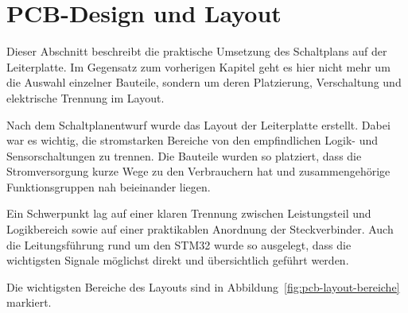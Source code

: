 \newpage
\section{PCB-Design und Layout}
Dieser Abschnitt beschreibt die praktische Umsetzung des Schaltplans auf der Leiterplatte. Im Gegensatz zum vorherigen Kapitel geht es hier nicht mehr um die Auswahl einzelner Bauteile, sondern um deren Platzierung, Verschaltung und elektrische Trennung im Layout.

Nach dem Schaltplanentwurf wurde das Layout der Leiterplatte erstellt. Dabei war es wichtig, die stromstarken Bereiche von den empfindlichen Logik- und Sensorschaltungen zu trennen. Die Bauteile wurden so platziert, dass die Stromversorgung kurze Wege zu den Verbrauchern hat und zusammengehörige Funktionsgruppen nah beieinander liegen.

Ein Schwerpunkt lag auf einer klaren Trennung zwischen Leistungsteil und Logikbereich sowie auf einer praktikablen Anordnung der Steckverbinder. Auch die Leitungsführung rund um den STM32 wurde so ausgelegt, dass die wichtigsten Signale möglichst direkt und übersichtlich geführt werden.

Die wichtigsten Bereiche des Layouts sind in Abbildung~\ref{fig:pcb-layout-bereiche} markiert.

